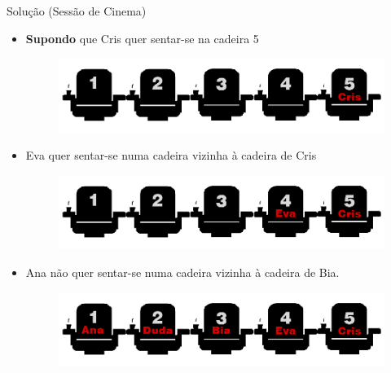 \documentclass{beamer}
\begin{document}
\begin{frame}{Solução (Sessão de Cinema)}
\begin{itemize}
    \item \textbf{Supondo} que Cris quer sentar-se na cadeira 5
        \begin{figure}[ht]
        \centering
        \includegraphics[width=.8\textwidth]{nomes4.png}
        \label{fig:exampleFig2}
        \end{figure}
        \pause
        
    \item Eva quer sentar-se numa cadeira vizinha à cadeira de Cris
       \pause
       
       \begin{figure}[ht]
        \centering
        \includegraphics[width=.8\textwidth]{nomes5.png}
        \label{fig:exampleFig2}
        \end{figure}
    \item Ana não quer sentar-se numa cadeira vizinha à cadeira de Bia. \begin{figure}[ht]
        \centering
        \includegraphics[width=.8\textwidth]{nome6.png}
        \label{fig:exampleFig2}
        \end{figure}

\end{itemize}
\end{frame}

\end{document}
